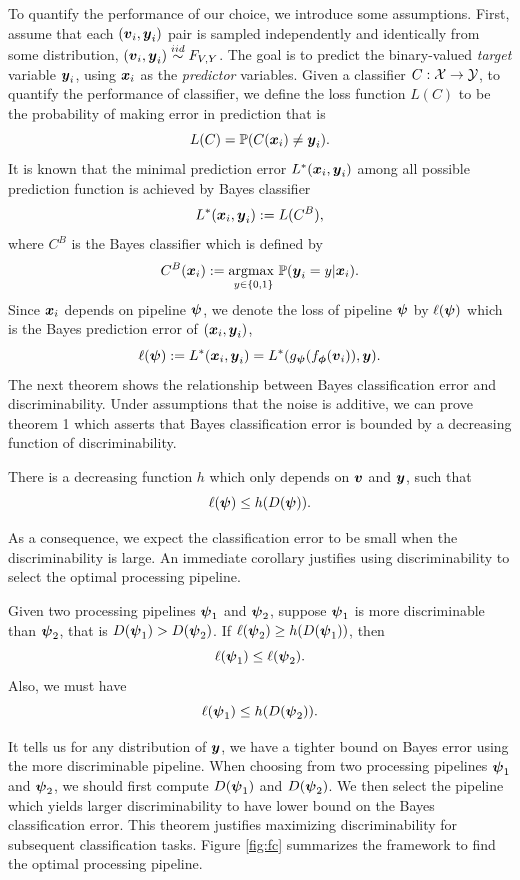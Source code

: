 \documentclass{article}
\begin{document}
To quantify the performance of our choice, we introduce some assumptions.  First, assume that each $(\boldsymbol{v}_i,\boldsymbol{y}_i)$ pair is sampled independently and identically from some distribution, $(\boldsymbol{v}_i,\boldsymbol{y}_i) \overset{iid}{\sim} F_{V,Y}$. The goal is to predict the binary-valued \emph{target} variable $\boldsymbol{y}_i$,  using $\boldsymbol{x}_i$ as the \emph{predictor} variables. Given a classifier $C: \mathcal{X} \rightarrow \mathcal{Y}$, to quantify the performance of classifier, we define the loss function $L(C)$ to be the probability of making error in prediction that is
\[L(C) = \mathbb{P}(C(\boldsymbol{x}_i) \neq \boldsymbol{y}_i). \]
It is known that the minimal prediction error $L^*(\boldsymbol{x}_i,\boldsymbol{y}_i)$ among all possible prediction function is achieved by Bayes classifier \cite{devroye2013probabilistic}
\[L^*(\boldsymbol{x}_i,\boldsymbol{y}_i) : = L(C^B),\]
where $C^{B}$ is the Bayes classifier which is defined by
\[C^{B}(\boldsymbol{x}_i):= \underset{y \in \{0,1\} }{\text{argmax }} \mathbb{P}(\boldsymbol{y}_i=y|\boldsymbol{x}_i).\] 
Since $\boldsymbol{x}_i$ depends on pipeline $\boldsymbol{\psi}$, we denote the loss of pipeline $\boldsymbol{\psi}$ by $\ell(\boldsymbol{\psi})$ which is the Bayes prediction error of $(\boldsymbol{x}_i, \boldsymbol{y}_i)$,
\[\ell(\boldsymbol{\psi}):= L^*(\boldsymbol{x}_i,\boldsymbol{y}_i) = L^*(g_{\boldsymbol{\psi}} (f_{\boldsymbol{\phi}} (\boldsymbol{v}_i) ),\boldsymbol{y}). \] 
The next theorem shows the relationship between Bayes classification error and discriminability. Under assumptions that the noise is additive, we can prove theorem 1 which asserts that Bayes classification error is bounded by a decreasing function of discriminability. 
\begin{thm}	
	There is a decreasing function $h$ which only depends on $\boldsymbol{v}$ and $\boldsymbol{y}$, such that
	\[\ell(\boldsymbol{\psi}) \leq h(D(\boldsymbol{\psi})) .\]
\end{thm}
As a consequence, we expect the classification error to be small when the discriminability is large. An immediate corollary justifies using discriminability to select the optimal processing pipeline. 
\begin{coro}	
	Given two processing pipelines $\boldsymbol{\psi}_1$ and $\boldsymbol{\psi}_2$, suppose $\boldsymbol{\psi}_1$ is more discriminable than $\boldsymbol{\psi}_2$, that is $D(\boldsymbol{\psi}_1) > D(\boldsymbol{\psi}_2)$. If $\ell(\boldsymbol{\psi}_2) \geq h(D(\boldsymbol{\psi}_1))$, then
	\[ \ell(\boldsymbol{\psi}_1) \leq \ell(\boldsymbol{\psi}_2). \] 
	Also, we must have
	\[ \ell(\boldsymbol{\psi}_1) \leq h(D(\boldsymbol{\psi}_2)). \]
	
\end{coro}
It tells us for any distribution of $\boldsymbol{y}$, we have a tighter bound on Bayes error using the more discriminable pipeline. When choosing from two processing pipelines $\boldsymbol{\psi}_1$ and $\boldsymbol{\psi}_2$, we should first compute $D(\boldsymbol{\psi}_1)$ and $D(\boldsymbol{\psi}_2)$. We then select the pipeline which yields larger discriminability to have lower bound on the Bayes classification error. This theorem justifies maximizing discriminability for subsequent classification tasks. Figure \ref{fig:fc} summarizes the framework to find the optimal processing pipeline. 
\end{document}
